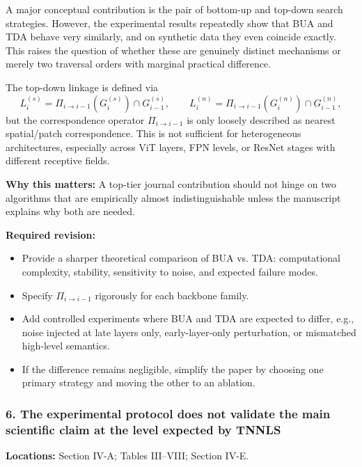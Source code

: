 A major conceptual contribution is the pair of bottom-up and top-down search strategies. However, the experimental results repeatedly show that BUA and TDA behave very similarly, and on synthetic data they even coincide exactly. This raises the question of whether these are genuinely distinct mechanisms or merely two traversal orders with marginal practical difference.

The top-down linkage is defined via
\begin{equation}
L_i^{(s)} = \Pi_{i \to i-1}(G_i^{(s)}) \cap G_{i-1}^{(s)},
\qquad
L_i^{(n)} = \Pi_{i \to i-1}(G_i^{(n)}) \cap G_{i-1}^{(n)},
\end{equation}
but the correspondence operator $\Pi_{i \to i-1}$ is only loosely described as nearest spatial/patch correspondence. This is not sufficient for heterogeneous architectures, especially across ViT layers, FPN levels, or ResNet stages with different receptive fields.

\textbf{Why this matters:} A top-tier journal contribution should not hinge on two algorithms that are empirically almost indistinguishable unless the manuscript explains why both are needed.

\textbf{Required revision:}
\begin{itemize}
    \item Provide a sharper theoretical comparison of BUA vs. TDA: computational complexity, stability, sensitivity to noise, and expected failure modes.
    \item Specify $\Pi_{i \to i-1}$ rigorously for each backbone family.
    \item Add controlled experiments where BUA and TDA are expected to differ, e.g., noise injected at late layers only, early-layer-only perturbation, or mismatched high-level semantics.
    \item If the difference remains negligible, simplify the paper by choosing one primary strategy and moving the other to an ablation.
\end{itemize}

\subsubsection*{6. The experimental protocol does not validate the main scientific claim at the level expected by TNNLS}
\textbf{Locations:} Section IV-A; Tables III--VIII; Section IV-E.

